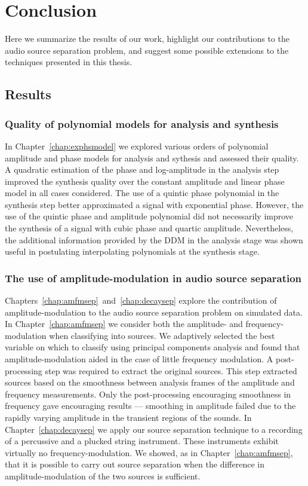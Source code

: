 \chapter{Conclusion\label{chap:conclusion}}

Here we summarize the results of our work, highlight our contributions to the
audio source separation problem, and suggest some possible extensions to the
techniques presented in this thesis.

\section{Results}

\subsection{Quality of polynomial models for analysis and synthesis}

In Chapter~\ref{chap:exphsmodel} we explored various orders of polynomial amplitude and
phase models for analysis and sythesis and assessed their quality. A
quadratic estimation of the phase and log-amplitude in the analysis step
improved the synthesis quality over the constant amplitude and linear phase
model in all cases considered. The use of a quintic phase
polynomial in the synthesis step better approximated a signal with exponential
phase. However, the use of the quintic phase and amplitude polynomial did not
necessarily improve the synthesis of a signal with cubic phase and quartic
amplitude. Nevertheless, the additional information provided by the DDM in the
analysis stage was shown useful in postulating interpolating polynomials at the
synthesis stage.

\subsection{The use of amplitude-modulation in audio source separation}

Chapters~\ref{chap:amfmsep}~and~\ref{chap:decaysep} explore the contribution of
amplitude-modulation to the audio source separation problem on simulated data.
In Chapter~\ref{chap:amfmsep} we consider both the amplitude- and
frequency-modulation when classifying into sources. We adaptively selected the
best variable on which to classify using principal components analysis and found
that amplitude-modulation aided in the case of little frequency modulation. A
post-processing step was required to extract the original sources. This step
extracted sources based on the smoothness between analysis frames of the
amplitude and frequency measurements.  Only the post-processing encouraging
smoothness in frequency gave encouraging results --- smoothing in amplitude
failed due to the rapidly varying amplitude in the transient regions of the
sounds. In Chapter~\ref{chap:decaysep} we apply our source separation technique
to a recording of a percussive and a plucked string instrument. These
instruments exhibit virtually no frequency-modulation. We showed, as in
Chapter~\ref{chap:amfmsep}, that it is
possible to carry out source separation when the difference in
amplitude-modulation of the two sources is sufficient. 


